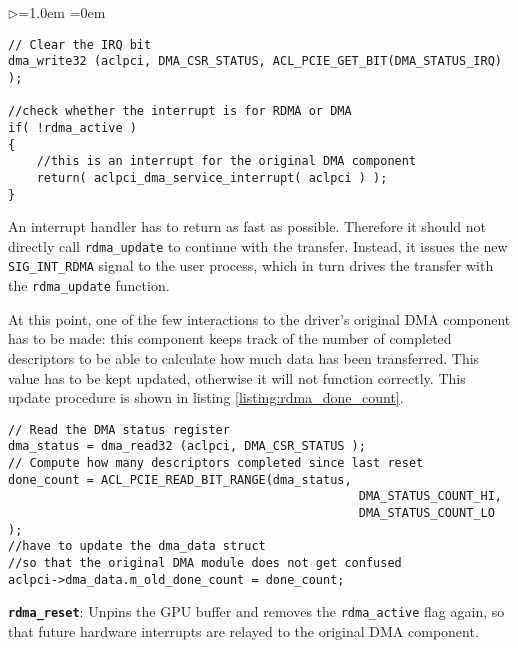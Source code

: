 \begin{list}{$\triangleright$}{\leftmargin=1.0em \itemindent=0em}

\begin{lstlisting}[label=listing:rdma_clear_irq, caption=Acknowledging the interrupt and relaying to the original handler if needed]
// Clear the IRQ bit
dma_write32 (aclpci, DMA_CSR_STATUS, ACL_PCIE_GET_BIT(DMA_STATUS_IRQ) );

//check whether the interrupt is for RDMA or DMA
if( !rdma_active )
{
	//this is an interrupt for the original DMA component
	return( aclpci_dma_service_interrupt( aclpci ) );
}
\end{lstlisting}

An interrupt handler has to return as fast as possible. %
	Therefore it should not directly call \texttt{rdma\_update} to continue with the transfer.
	Instead, it issues the new \texttt{SIG\_INT\_RDMA} signal to the user process, which in turn drives the transfer with the \texttt{rdma\_update} function.

At this point, one of the few interactions to the driver's original DMA component has to be made:
this component keeps track of the number of completed descriptors to be able to calculate how much data has been transferred.
This value has to be kept updated, otherwise it will not function correctly.
This update procedure is shown in listing \ref{listing:rdma_done_count}.

\begin{lstlisting}[label=listing:rdma_done_count, caption=Updating the number of completed descriptors in the original code, morekeywords={m_old_done_count}]
// Read the DMA status register
dma_status = dma_read32 (aclpci, DMA_CSR_STATUS );
// Compute how many descriptors completed since last reset
done_count = ACL_PCIE_READ_BIT_RANGE(dma_status, 
                                                 DMA_STATUS_COUNT_HI,
                                                 DMA_STATUS_COUNT_LO );
//have to update the dma_data struct
//so that the original DMA module does not get confused
aclpci->dma_data.m_old_done_count = done_count;
\end{lstlisting}



	
	\item {\bf \texttt{rdma\_reset}}: Unpins the GPU buffer and removes the \texttt{rdma\_active} flag again, so that future hardware interrupts are relayed to the original DMA component.
\end{list}










